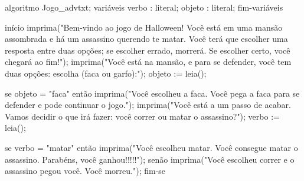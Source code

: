\documentclass[a4paper,12pt]{article} %
\begin{document}




\clearpage %


algoritmo Jogo_advtxt;
variáveis
    verbo : literal;
    objeto : literal;
fim-variáveis

início
    imprima("Bem-vindo ao jogo de Halloween! Você está em uma mansão assombrada e há um assassino querendo te matar. Você terá que escolher uma resposta entre duas opções; se escolher errado, morrerá. Se escolher certo, você chegará ao fim!\n");
    imprima("Você está na mansão, e para se defender, você tem duas opções: escolha (faca ou garfo):\n");
    objeto := leia();

    se objeto = "faca" então
        imprima("Você escolheu a faca. Você pega a faca para se defender e pode continuar o jogo.\n");
        imprima("Você está a um passo de acabar. Vamos decidir o que irá fazer: você correr ou matar o assassino?\n");
        verbo := leia();

        se verbo = "matar" então
            imprima("Você escolheu matar. Você consegue matar o assassino. Parabéns, você ganhou!!!!!\n");
        senão
            imprima("Você escolheu correr e o assassino pegou você. Você morreu.\n");
        fim-se
\end{document}
